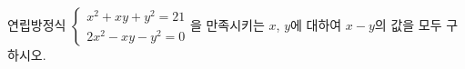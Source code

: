 연립방정식 $\begin{cases} x^2+xy+y^2=21 \\ 2x^2-xy-y^2=0 \end{cases}$을 만족시키는 $x$, $y$에 대하여 $x-y$의 값을 모두 구하시오.
